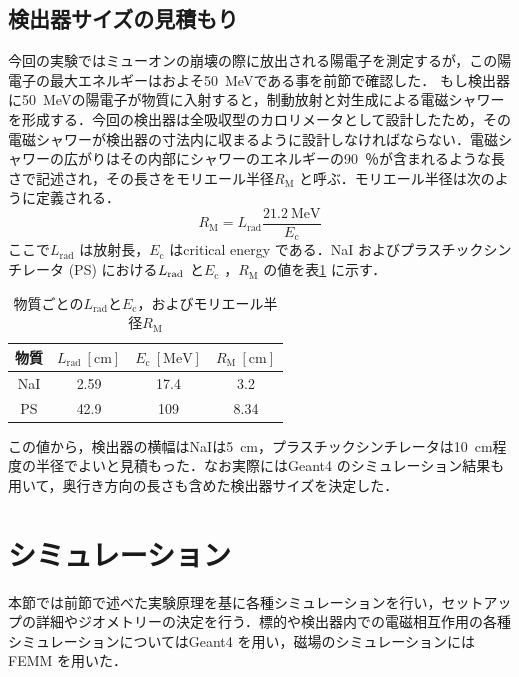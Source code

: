 \subsection{検出器サイズの見積もり}
今回の実験ではミューオンの崩壊の際に放出される陽電子を測定するが，この陽電子の最大エネルギーはおよそ50~MeVである事を前節で確認した．
もし検出器に50~MeVの陽電子が物質に入射すると，制動放射と対生成による電磁シャワーを形成する．今回の検出器は全吸収型のカロリメータとして設計したため，その電磁シャワーが検出器の寸法内に収まるように設計しなければならない．電磁シャワーの広がりはその内部にシャワーのエネルギーの90~％が含まれるような長さで記述され，その長さをモリエール半径$R_\mathrm{M}$ と呼ぶ．モリエール半径は次のように定義される．
\begin{equation}
R_\mathrm{M} = L_\mathrm{rad}\frac{21.2~\mathrm{MeV}}{E_\mathrm{c}}
\end{equation}
ここで$L_\mathrm{rad}$ は放射長，$E_\mathrm{c}$ はcritical energy である．NaI およびプラスチックシンチレータ (PS) における$L_{\rm rad}$ と$E_\mathrm{c}$ ，$R_\mathrm{M}$ の値を表\ref{tab:abe_rm} に示す．
\begin{table}[hbtp]
\centering
\caption{物質ごとの$L_\mathrm{rad}$と$E_\mathrm{c}$，およびモリエール半径$R_\mathrm{M}$}
\begin{tabular}{cccc}\toprule
物質 & $L_\mathrm{rad}~[\mathrm{cm}]$ & $E_\mathrm{c}~[\mathrm{MeV}]$ & $R_\mathrm{M}~[\mathrm{cm}]$ \\ \midrule
NaI & 2.59 & 17.4 & 3.2 \\
PS & 42.9 & 109 & 8.34 \\ \bottomrule
\end{tabular}
\label{tab:abe_rm}
\end{table}
この値から，検出器の横幅はNaIは5~cm，プラスチックシンチレータは10~cm程度の半径でよいと見積もった．なお実際にはGeant4 のシミュレーション結果も用いて，奥行き方向の長さも含めた検出器サイズを決定した．
\newpage

\section{シミュレーション}%
本節では前節で述べた実験原理を基に各種シミュレーションを行い，セットアップの詳細やジオメトリーの決定を行う．標的や検出器内での電磁相互作用の各種シミュレーションについてはGeant4 を用い，磁場のシミュレーションにはFEMM を用いた．
	
